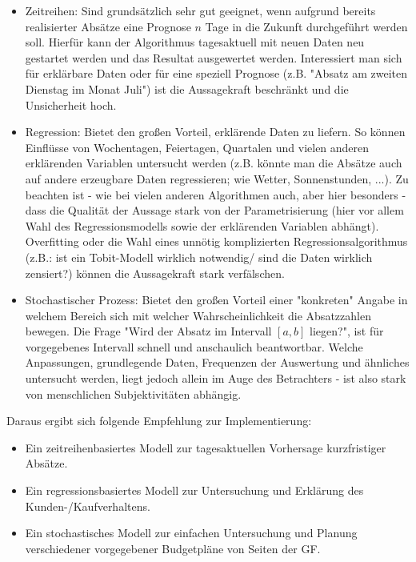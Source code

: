 \documentclass[a4paper,11pt]{article}
\begin{document}
\begin{itemize}
	\item Zeitreihen: Sind grundsätzlich sehr gut geeignet, wenn aufgrund bereits realisierter Absätze eine Prognose $n$ Tage in die Zukunft durchgeführt werden soll. Hierfür kann der Algorithmus tagesaktuell mit neuen Daten neu gestartet werden und das Resultat ausgewertet werden. Interessiert man sich für erklärbare Daten oder für eine speziell Prognose (z.B. "Absatz am zweiten Dienstag im Monat Juli") ist die Aussagekraft beschränkt und die Unsicherheit hoch.
	\item Regression: Bietet den großen Vorteil, erklärende Daten zu liefern. So können Einflüsse von Wochentagen, Feiertagen, Quartalen und vielen anderen erklärenden Variablen untersucht werden (z.B. könnte man die Absätze auch auf andere erzeugbare Daten regressieren; wie Wetter, Sonnenstunden, ...). Zu beachten ist - wie bei vielen anderen Algorithmen auch, aber hier besonders - dass die Qualität der Aussage stark von der Parametrisierung (hier vor allem Wahl des Regressionsmodells sowie der erklärenden Variablen abhängt). Overfitting oder die Wahl eines unnötig komplizierten Regressionsalgorithmus (z.B.: ist ein Tobit-Modell wirklich notwendig/ sind die Daten wirklich zensiert?) können die Aussagekraft stark verfälschen.
	\item Stochastischer Prozess: Bietet den großen Vorteil einer "konkreten" Angabe in welchem Bereich sich mit welcher Wahrscheinlichkeit die Absatzzahlen bewegen. Die Frage "Wird der Absatz im Intervall $[a,b]$ liegen?", ist für vorgegebenes Intervall schnell und anschaulich beantwortbar. Welche Anpassungen, grundlegende Daten, Frequenzen der Auswertung und ähnliches untersucht werden, liegt jedoch allein im Auge des Betrachters - ist also stark von menschlichen Subjektivitäten abhängig.
\end{itemize}

Daraus ergibt sich folgende Empfehlung zur Implementierung:
\begin{itemize}
	\item Ein zeitreihenbasiertes Modell zur tagesaktuellen Vorhersage kurzfristiger Absätze.
	\item Ein regressionsbasiertes Modell zur Untersuchung und Erklärung des Kunden-/Kaufverhaltens.
	\item Ein stochastisches Modell zur einfachen Untersuchung und Planung verschiedener vorgegebener Budgetpläne von Seiten der GF.
\end{itemize}


\newpage


\end{document}
